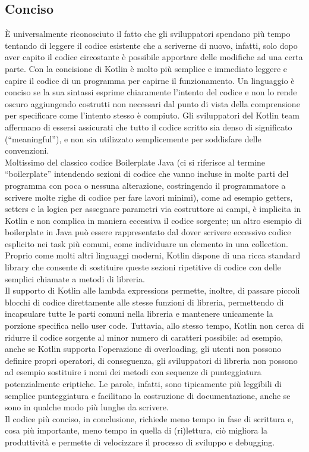 \subsection{Conciso}

È universalmente riconosciuto il fatto che gli sviluppatori spendano più tempo tentando di leggere il codice esistente che a scriverne di nuovo, infatti, solo dopo aver capito il codice circostante è possibile apportare delle modifiche ad una certa parte. Con la concisione di Kotlin è molto più semplice e immediato leggere e capire il codice di un programma per capirne il funzionamento. Un linguaggio è conciso se la sua sintassi esprime chiaramente l'intento del codice e non lo rende oscuro aggiungendo costrutti non necessari dal punto di vista della comprensione per specificare come l'intento stesso è compiuto. Gli sviluppatori del Kotlin team affermano di essersi assicurati che tutto il codice scritto sia denso di significato (“meaningful”), e non sia utilizzato semplicemente per soddisfare delle convenzioni.\\
Moltissimo del classico codice Boilerplate Java (ci si riferisce al termine “boilerplate” intendendo sezioni di codice che vanno incluse in molte parti del programma con poca o nessuna alterazione, costringendo il programmatore a scrivere molte righe di codice per fare lavori minimi), come ad esempio getters, setters e la logica per assegnare parametri via costruttore ai campi, è implicita in Kotlin e non complica in maniera eccessiva il codice sorgente; un altro esempio di boilerplate in Java può essere rappresentato dal dover scrivere eccessivo codice esplicito nei task più comuni, come individuare un elemento in una collection. Proprio come molti altri linguaggi moderni, Kotlin dispone di una ricca standard library che consente di sostituire queste sezioni ripetitive di codice con delle semplici chiamate a metodi di libreria.\\
Il supporto di Kotlin alle lambda expressions permette, inoltre, di passare piccoli blocchi di codice direttamente alle stesse funzioni di libreria, permettendo di incapsulare tutte le parti comuni nella libreria e mantenere unicamente la porzione specifica nello user code. Tuttavia, allo stesso tempo, Kotlin non cerca di ridurre il codice sorgente al minor numero di caratteri possibile: ad esempio, anche se Kotlin supporta l'operazione di overloading, gli utenti non possono definire propri operatori, di conseguenza, gli sviluppatori di libreria non possono ad esempio sostituire i nomi dei metodi con sequenze di punteggiatura potenzialmente criptiche. Le parole, infatti, sono tipicamente più leggibili di semplice punteggiatura e facilitano la costruzione di documentazione, anche se sono in qualche modo più lunghe da scrivere.\\
Il codice più conciso, in conclusione, richiede meno tempo in fase di scrittura e, cosa più importante, meno tempo in quella di (ri)lettura, ciò migliora la produttività e permette di velocizzare il processo di sviluppo e debugging.\\

